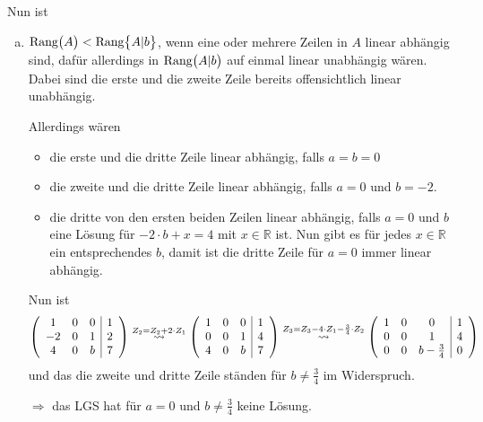 \documentclass{scrreprt}
\begin{document}
Nun ist
\begin{enumerate}[(a)]
\item $\text{Rang}\qty\big(A) < \text{Rang}\qty\big{A|b}$, wenn eine oder
  mehrere Zeilen in $A$ linear abhängig sind, dafür allerdings in
  $\text{Rang}\qty\big(A|b)$ auf einmal linear unabhängig wären.
  Dabei sind die erste und die zweite Zeile bereits offensichtlich linear
  unabhängig.

  Allerdings wären
  \begin{itemize}
  \item die erste und die dritte Zeile linear abhängig, falls $a = b = 0$
  \item die zweite und die dritte Zeile linear abhängig, falls $a = 0$ und
    $b = -2$.
  \item die dritte von den ersten beiden Zeilen linear abhängig, falls
    $a = 0$ und $b$ eine Lösung für $-2 \cdot b + x = 4$ mit $x \in \mathbb{R}$
    ist.
    Nun gibt es für jedes $x \in \mathbb{R}$ ein entsprechendes $b$, damit ist
    die dritte Zeile für $a = 0$ immer linear abhängig.
  \end{itemize}
  Nun ist
  \[
    \qty(\begin{array}{ccc|c}
      1  & 0 & 0 & 1 \\
      -2 & 0 & 1 & 2 \\
      4  & 0 & b & 7 \\
    \end{array})
    \overset{Z_2 = Z_2 + 2 \cdot Z_1}\leadsto
    \qty(\begin{array}{ccc|c}
      1 & 0 & 0 & 1 \\
      0 & 0 & 1 & 4 \\
      4 & 0 & b & 7 \\
    \end{array})
    \overset{Z_3 = Z_3 - 4 \cdot Z_1 - \frac{3}{4} \cdot Z_2}\leadsto
    \qty(\begin{array}{ccc|c}
      1 & 0 & 0               & 1 \\
      0 & 0 & 1               & 4 \\
      0 & 0 & b - \frac{3}{4} & 0 \\
    \end{array})
  \]
  und das die zweite und dritte Zeile ständen für $b \ne \frac{3}{4}$ im
  Widerspruch.

  $\Rightarrow$ das LGS hat für $a = 0$ und $b \ne \frac{3}{4}$ keine Lösung.


\end{enumerate}
\end{document}
